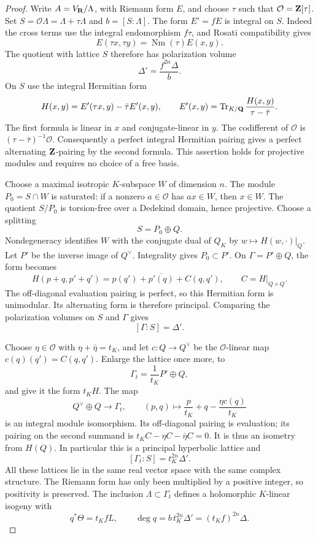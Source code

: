 \begin{proof}
Write $A=V_{\mathbf R}/\Lambda$, with Riemann form $E$, and choose $\tau$ such that $\mathcal O=\mathbf Z[\tau]$. Set $S=\mathcal O\Lambda=\Lambda+\tau\Lambda$ and $b=[S:\Lambda]$. The form $E'=fE$ is integral on $S$. Indeed the cross terms use the integral endomorphism $f\tau$, and Rosati compatibility gives
\[
 E(\tau x,\tau y)=\operatorname{Nm}(\tau)E(x,y).
\]
The quotient with lattice $S$ therefore has polarization volume
\[
 \Delta'=\frac{f^{2n}\Delta}{b}.
\]
On $S$ use the integral Hermitian form
\[
 H(x,y)=E'(\tau x,y)-\bar\tau E'(x,y),
 \qquad
 E'(x,y)=\operatorname{Tr}_{K/\mathbf Q}
          \frac{H(x,y)}{\tau-\bar\tau}.
\]
The first formula is linear in $x$ and conjugate-linear in $y$. The codifferent of $\mathcal O$ is $(\tau-\bar\tau)^{-1}\mathcal O$. Consequently a perfect integral Hermitian pairing gives a perfect alternating $\mathbf Z$-pairing by the second formula. This assertion holds for projective modules and requires no choice of a free basis.

Choose a maximal isotropic $K$-subspace $W$ of dimension $n$. The module $P_0=S\cap W$ is saturated: if a nonzero $a\in\mathcal O$ has $ax\in W$, then $x\in W$. The quotient $S/P_0$ is torsion-free over a Dedekind domain, hence projective. Choose a splitting
\[
 S=P_0\oplus Q.
\]
Nondegeneracy identifies $W$ with the conjugate dual of $Q_K$ by $w\mapsto H(w,\cdot)|_Q$. Let $P'$ be the inverse image of $Q^\vee$. Integrality gives $P_0\subset P'$. On $\Gamma=P'\oplus Q$, the form becomes
\[
 H(p+q,p'+q')=p(q')+\overline{p'(q)}+C(q,q'),
 \qquad C=H|_{Q\times Q}.
\]
The off-diagonal evaluation pairing is perfect, so this Hermitian form is unimodular. Its alternating form is therefore principal. Comparing the polarization volumes on $S$ and $\Gamma$ gives
\[
 [\Gamma:S]=\Delta'.
\]

Choose $\eta\in\mathcal O$ with $\eta+\bar\eta=t_K$, and let $c:Q\to Q^\vee$ be the $\mathcal O$-linear map $c(q)(q')=C(q,q')$. Enlarge the lattice once more, to
\[
 \Gamma_t=\frac1{t_K}P'\oplus Q,
\]
and give it the form $t_KH$. The map
\[
 Q^\vee\oplus Q\longrightarrow\Gamma_t,
 \qquad (p,q)\longmapsto\frac p{t_K}+q-
                                  \frac{\eta c(q)}{t_K}
\]
is an integral module isomorphism. Its off-diagonal pairing is evaluation; its pairing on the second summand is
$t_KC-\eta C-\bar\eta C=0$. It is thus an isometry from $H(Q)$.
In particular this is a principal hyperbolic lattice and
\[
 [\Gamma_t:S]=t_K^{2n}\Delta'.
\]
All these lattices lie in the same real vector space with the same complex structure. The Riemann form has only been multiplied by a positive integer, so positivity is preserved. The inclusion $\Lambda\subset\Gamma_t$ defines a holomorphic $K$-linear isogeny with
\[
 q^*\Theta=t_K fL,
 \qquad \deg q=b\,t_K^{2n}\Delta'=(t_K f)^{2n}\Delta.
\]


\end{proof}
